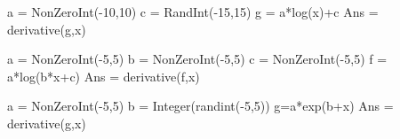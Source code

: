 \begin{sagesilent}
a = NonZeroInt(-10,10)
c = RandInt(-15,15)
g = a*log(x)+c
Ans = derivative(g,x)

\end{sagesilent}



\begin{sagesilent}
a = NonZeroInt(-5,5)
b = NonZeroInt(-5,5)
c = NonZeroInt(-5,5)
f = a*log(b*x+c)
Ans = derivative(f,x)
\end{sagesilent}


\begin{sagesilent}
a = NonZeroInt(-5,5)
b = Integer(randint(-5,5))
g=a*exp(b+x)
Ans = derivative(g,x)
\end{sagesilent}



